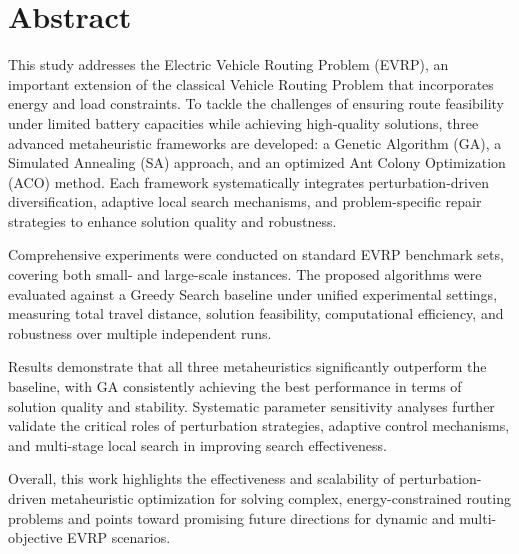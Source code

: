 \section*{Abstract}
This study addresses the Electric Vehicle Routing Problem (EVRP), an important extension of the classical Vehicle Routing Problem that incorporates energy and load constraints. To tackle the challenges of ensuring route feasibility under limited battery capacities while achieving high-quality solutions, three advanced metaheuristic frameworks are developed: a Genetic Algorithm (GA), a Simulated Annealing (SA) approach, and an optimized Ant Colony Optimization (ACO) method. Each framework systematically integrates perturbation-driven diversification, adaptive local search mechanisms, and problem-specific repair strategies to enhance solution quality and robustness.

Comprehensive experiments were conducted on standard EVRP benchmark sets, covering both small- and large-scale instances. The proposed algorithms were evaluated against a Greedy Search baseline under unified experimental settings, measuring total travel distance, solution feasibility, computational efficiency, and robustness over multiple independent runs.

Results demonstrate that all three metaheuristics significantly outperform the baseline, with GA consistently achieving the best performance in terms of solution quality and stability. Systematic parameter sensitivity analyses further validate the critical roles of perturbation strategies, adaptive control mechanisms, and multi-stage local search in improving search effectiveness.

Overall, this work highlights the effectiveness and scalability of perturbation-driven metaheuristic optimization for solving complex, energy-constrained routing problems and points toward promising future directions for dynamic and multi-objective EVRP scenarios.

